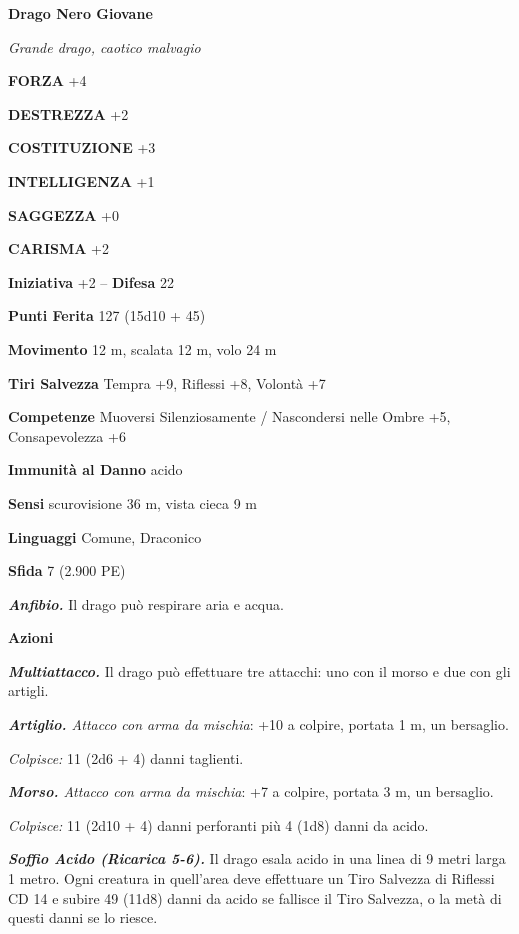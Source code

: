 \begin{multicols}{2}
\medskip{}\textbf{Drago Nero Giovane}

\emph{Grande drago, caotico malvagio}

\textbf{FORZA} +4

\textbf{DESTREZZA} +2

\textbf{COSTITUZIONE} +3

\textbf{INTELLIGENZA} +1

\textbf{SAGGEZZA} +0

\textbf{CARISMA} +2

\textbf{Iniziativa} +2 -- \textbf{Difesa} 22

\textbf{Punti Ferita} 127 (15d10 + 45)

\textbf{Movimento} 12 m, scalata 12 m, volo 24 m

\textbf{Tiri Salvezza} Tempra +9, Riflessi +8, Volontà +7

\textbf{Competenze} Muoversi Silenziosamente / Nascondersi nelle Ombre +5, Consapevolezza +6

\textbf{Immunità al Danno} acido

\textbf{Sensi} scurovisione 36 m, vista cieca 9 m

\textbf{Linguaggi} Comune, Draconico

\textbf{Sfida} 7 (2.900 PE)

\emph{\textbf{Anfibio.}} Il drago può respirare aria e acqua.

\textbf{Azioni}

\emph{\textbf{Multiattacco.}} Il drago può effettuare tre attacchi: uno con il morso e due con gli artigli.

\emph{\textbf{Artiglio.} Attacco con arma da mischia}: +10 a colpire, portata 1 m, un bersaglio.

\emph{Colpisce:} 11 (2d6 + 4) danni taglienti.

\emph{\textbf{Morso.} Attacco con arma da mischia}: +7 a colpire, portata 3 m, un bersaglio.

\emph{Colpisce:} 11 (2d10 + 4) danni perforanti più 4 (1d8) danni da acido.

\emph{\textbf{Soffio Acido (Ricarica 5-6).}} Il drago esala acido in una linea di 9 metri larga 1 metro. Ogni creatura in quell'area deve effettuare un Tiro Salvezza di Riflessi CD 14 e subire 49 (11d8) danni da acido se fallisce il Tiro Salvezza, o la metà di questi danni se lo riesce.


\end{multicols}
